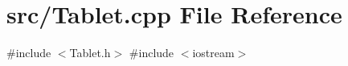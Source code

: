 \section{src/\+Tablet.cpp File Reference}
\label{_tablet_8cpp}
{\ttfamily \#include $<$Tablet.\+h$>$}\newline
{\ttfamily \#include $<$iostream$>$}\newline
